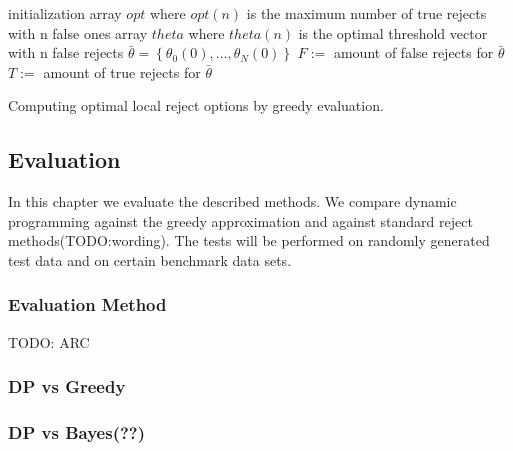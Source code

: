 \begin{algorithm}[!htbp]
 initialization\;
 array $opt$ where $opt(n)$ is the maximum number of true rejects with n false ones \;
 array $theta$ where $theta(n)$ is the optimal threshold vector with n false rejects \; 
 $\bar{\theta} = \left\{\theta_0(0),...,\theta_N(0)\right\}$ \; 
 $F :=$ amount of false rejects for $\bar{\theta}$ \;
 $T :=$ amount of true rejects for $\bar{\theta}$ \;
 \BlankLine \BlankLine
 \caption{Computing optimal local reject options by greedy evaluation.}
 \label{greedy}
\end{algorithm}

\subsection{Evaluation}
In this chapter we evaluate the described methods. We compare dynamic programming against the greedy approximation and against standard reject methods(TODO:wording). The tests will be performed on randomly generated test data and on certain benchmark data sets.

\subsubsection{Evaluation Method}
TODO: ARC

\subsubsection{DP vs Greedy}

\subsubsection{DP vs Bayes(??)}